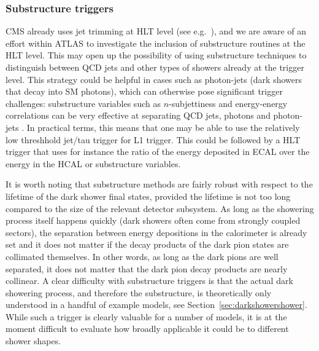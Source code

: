 \subsubsection{Substructure triggers}  
CMS already uses jet trimming at HLT level (see e.g.~\cite{Sirunyan:2017wto,Sirunyan:2017acf}), and we are aware of an effort within ATLAS to investigate the inclusion of substructure routines at the HLT level.   This may open up the possibility of using substructure techniques to distinguish between QCD jets and other types of showers already at the trigger level. This strategy could be helpful in cases such as photon-jets (dark showers that decay into SM photons), which can otherwise pose significant trigger challenges: substructure variables such as $n$-subjettiness \cite{Thaler:2010tr} and energy-energy correlations can be very effective at separating QCD jets, photons and photon-jets \cite{Ellis:2012sd,Ellis:2012zp}. In practical terms, this means that one may be able to use the relatively low threshhold jet/tau trigger for L1 trigger.  This could be followed by a HLT trigger that uses for instance the ratio of the energy deposited in ECAL over the energy in the HCAL or substructure variables.



It is worth noting that  substructure methods are fairly robust with respect to the lifetime of the dark shower final states, provided the lifetime is not too long compared to the size of the relevant detector subsystem. As long as the showering process itself happens quickly (dark showers often come from strongly coupled sectors), the separation between energy depositions in the calorimeter is already set and it does not matter if the decay products of the dark pion states are collimated themselves. In other words, as long as the dark pions are well separated, it does not matter that the dark pion decay products are nearly collinear. A clear difficulty with substructure triggers is that the actual dark showering process, and therefore the substructure, is theoretically only understood in a handful of example models, see Section~\ref{sec:darkshowershower}. While such a trigger is clearly valuable for a number of models, it is at the moment difficult to evaluate how broadly applicable it could be to different shower shapes.

